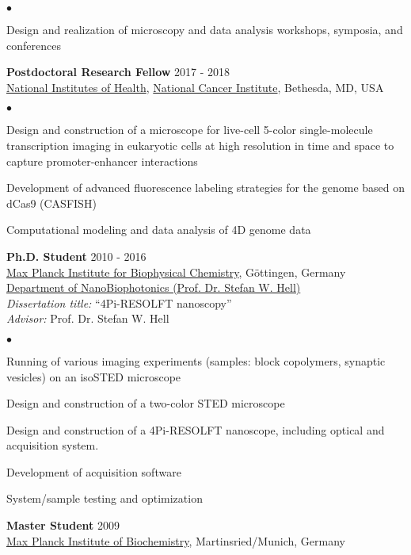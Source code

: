 \documentclass[margin,line]{res}
\newenvironment{list2}{
  \begin{list}{$\bullet$}{%
      \setlength{\itemsep}{0in}
      \setlength{\parsep}{0in} \setlength{\parskip}{0in}
      \setlength{\topsep}{0in} \setlength{\partopsep}{0in} 
      \setlength{\leftmargin}{0.2in}}}{\end{list}}
\begin{document}
\begin{resume}
\begin{list2}
\item Design and realization of microscopy and data analysis workshops, symposia, and conferences
\end{list2}
{\bf Postdoctoral Research Fellow} \hfill {2017 - 2018}\\
\href{https://www.nih.gov/}{National Institutes of Health}, \href{https://www.cancer.gov/}{National Cancer Institute}, Bethesda, MD, USA\\
\vspace*{-2mm}
\begin{list2}
\vspace*{-1mm}
\item Design and construction of a microscope for live-cell 5-color single-molecule transcription imaging in eukaryotic cells at high resolution in time and space to capture promoter-enhancer interactions 
\item Development of advanced fluorescence labeling strategies for the genome based on dCas9 (CASFISH)
\item Computational modeling and data analysis of 4D genome data
\end{list2}
{\bf Ph.D. Student} \hfill {2010 - 2016}\\
\href{https://www.mpibpc.mpg.de/en}{Max Planck Institute for Biophysical Chemistry}, Göttingen, Germany\\
\href{http://www.4pi.de/}{Department of NanoBiophotonics (Prof. Dr. Stefan W. Hell)}\\
{\it Dissertation title:} “4Pi-RESOLFT nanoscopy”\\
{\it Advisor:} Prof. Dr. Stefan W. Hell\\
\vspace*{-2mm}
\begin{list2}
\vspace*{-1mm}
\item Running of various imaging experiments (samples: block copolymers, synaptic vesicles) on an isoSTED microscope
\item Design and construction of a two-color STED microscope
\item Design and construction of a 4Pi-RESOLFT nanoscope, including optical and acquisition system.
\item Development of acquisition software
\item System/sample testing and optimization
\end{list2}
{\bf Master Student} \hfill {2009}\\
\href{https://www.biochem.mpg.de/en}{Max Planck Institute of Biochemistry}, Martinsried/Munich, Germany\\

\end{resume}
\end{document}
